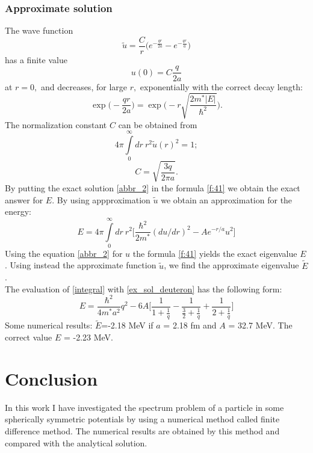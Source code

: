 \documentclass[a4paper, 14pt]{article}
\begin{document}
\subsubsection{Approximate solution}
The wave function
$$\widetilde{u} = \frac{C}{r}\displaystyle{\big(e^{-\frac{qr}{2a}} - e^{-\frac{qr}{a}}\big)} $$
has a finite value
$$u(0) = C\frac{q}{2a}$$
at $r=0,$ and decreases, for large $r,$ exponentially with the correct decay length:
$$\exp\bigg(-\frac{qr}{2a}\bigg) = \exp\bigg(-r \sqrt{\frac{2 m^* |E|}{\hbar^2}}\bigg).$$
The normalization constant $C$ can be obtained from 
$$4 \pi \displaystyle{\int\limits_{0}^ {\infty}} dr~ r^2 \widetilde{u}(r)^2 = 1;$$
\begin{equation}\label{f:41}
    C = \sqrt{\frac{3q}{2 \pi a}}.
\end{equation}
By putting the exact solution \eqref{abbr_2} in the formula \eqref{f:41} we obtain the exact answer for $E$. By using appproximation $\widetilde{u}$ we obtain an approximation for the energy:
\begin{equation}\label{integral}
    E = 4 \pi \int\limits_{0}^{\infty} dr ~r^2 \bigg[\frac{\hbar^2}{2 m^*}(du/dr)^2 -A e ^{-r/a} u^2\bigg]
\end{equation}
Using the equation \eqref{abbr_2}  for $u$ the formula \eqref{f:41} yields the exact eigenvalue $E$. Using instead the approximate function $\widetilde{u}$, we find the approximate eigenvalue $\widetilde{E}$.\\
The evaluation of \eqref{integral} with \eqref{ex_sol_deuteron} has the following form:
\begin{equation}
    E = \frac{\hbar^2}{4 m^* a^2}q^2 - 6 A \bigg[\frac{1}{1 + \frac{1}{q}} - \frac{1}{\frac{3}{2} + \frac{1}{q}} +  \frac{1}{2 + \frac{1}{q}} \bigg]
\end{equation}
Some numerical results: $\widetilde{E}$=-2.18 MeV if $a$ = 2.18 fm and $A$ = 32.7 MeV. The correct value $E$ = -2.23 MeV.

\section{Conclusion}
In this work I have investigated the spectrum problem of a particle in some spherically symmetric potentials by using a numerical method called finite difference method. The numerical results are obtained by this method and compared with the analytical solution. 
\end{document}
